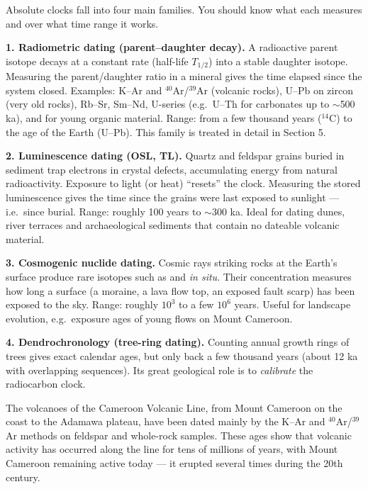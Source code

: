 \documentclass[11pt]{article}
\newcommand{\cle}[1]{{\popxbold\color{popdark}#1}}
\newcounter{popsec}
\newcounter{popsub}
\newcommand{\courssub}[1]{%
  \stepcounter{popsub}%
  \par\vspace{9pt}\noindent{\popxbold\fontsize{11.5}{13}\selectfont\color{popink}{\color{poporange}\thepopsec.\thepopsub}\hspace{6pt}#1}\par\nopagebreak\vspace{4pt}
}
\begin{document}
\courssub{Families of Absolute Dating Methods}

Absolute clocks fall into four main families. You should know what each measures and over what time range it works.

\textbf{1. Radiometric dating (parent--daughter decay).} A radioactive \cle{parent} isotope decays at a constant rate (half-life $T_{1/2}$) into a stable \cle{daughter} isotope. Measuring the parent/daughter ratio in a mineral gives the time elapsed since the system closed. Examples: K--Ar and $^{40}$Ar/$^{39}$Ar (volcanic rocks), U--Pb on zircon (very old rocks), Rb--Sr, Sm--Nd, U-series (e.g.\ U--Th for carbonates up to $\sim$500 ka), and  for young organic material. Range: from a few thousand years ($^{14}$C) to the age of the Earth (U--Pb). This family is treated in detail in Section 5.

\textbf{2. Luminescence dating (OSL, TL).} Quartz and feldspar grains buried in sediment trap electrons in crystal defects, accumulating energy from natural radioactivity. Exposure to light (or heat) ``resets'' the clock. Measuring the stored luminescence gives the time since the grains were last exposed to sunlight --- i.e.\ since burial. Range: roughly 100 years to $\sim$300 ka. Ideal for dating dunes, river terraces and archaeological sediments that contain no dateable volcanic material.

\textbf{3. Cosmogenic nuclide dating.} Cosmic rays striking rocks at the Earth's surface produce rare isotopes such as  and  \emph{in situ}. Their concentration measures how long a surface (a moraine, a lava flow top, an exposed fault scarp) has been exposed to the sky. Range: roughly $10^3$ to a few $10^6$ years. Useful for landscape evolution, e.g.\ exposure ages of young flows on Mount Cameroon.

\textbf{4. Dendrochronology (tree-ring dating).} Counting annual growth rings of trees gives exact calendar ages, but only back a few thousand years (about 12 ka with overlapping sequences). Its great geological role is to \emph{calibrate} the radiocarbon clock.

\begin{savaistu}
The volcanoes of the Cameroon Volcanic Line, from Mount Cameroon on the coast to the Adamawa plateau, have been dated mainly by the K--Ar and $^{40}$Ar/$^{39}$Ar methods on feldspar and whole-rock samples. These ages show that volcanic activity has occurred along the line for tens of millions of years, with Mount Cameroon remaining active today --- it erupted several times during the 20th century.
\end{savaistu}
\end{document}
